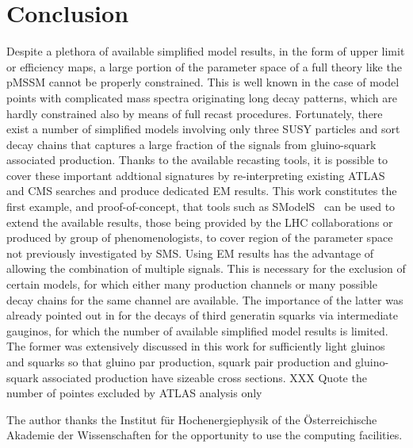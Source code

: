 \documentclass[a4paper,10pt]{article}
\newcommand{\SMO}{{\sc SModelS}}
\newcommand{\ONE}{\onecolumn}
\begin{document}
\section{Conclusion}
Despite a plethora of available simplified model results, in the form of upper limit or efficiency maps, a large portion of the parameter space of a full theory like the pMSSM cannot be properly constrained. This is well known in the case of model points with complicated mass spectra originating long decay patterns, which are hardly constrained also by means of full recast procedures. Fortunately, there exist a number of simplified models involving only three SUSY particles and sort decay chains that captures a large fraction of the signals from gluino-squark associated production. Thanks to the available recasting tools, it is possible to cover these important addtional signatures by re-interpreting existing ATLAS and CMS searches and produce dedicated EM results. This work constitutes the first example, and proof-of-concept, that tools such as \SMO~ can be used to extend the available results, those being provided by the LHC collaborations or produced by group of phenomenologists, to cover region of the parameter space not previously investigated by SMS. Using EM results has the advantage of allowing the combination of multiple signals. This is necessary for the exclusion of certain models, for which either many production channels or many possible decay chains for the same channel are available. The importance of the latter was already pointed out in \cite{Ambrogi:2017lov} for the decays of third generatin squarks via intermediate gauginos, for which the number of available simplified model results is limited. 
The former was extensively discussed in this work for sufficiently light gluinos and squarks so that gluino par production, squark pair production and gluino-squark associated production have sizeable cross sections. 
XXX Quote the number of pointes excluded by ATLAS analysis only



%
\acknowledgments
The author thanks the Institut f\"ur Hochenergiephysik of the \"Osterreichische Akademie der Wissenschaften for the opportunity to use the computing facilities.
%


\clearpage
\appendix
\ONE
\end{document}
